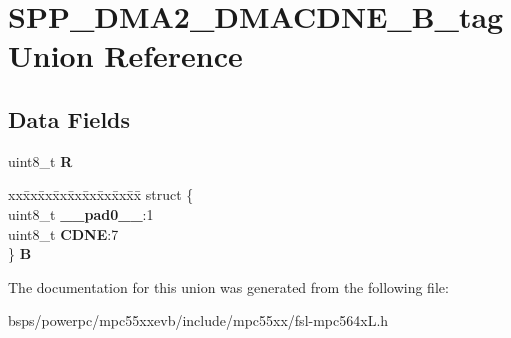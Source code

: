 \hypertarget{unionSPP__DMA2__DMACDNE__8B__tag}{}\section{S\+P\+P\+\_\+\+D\+M\+A2\+\_\+\+D\+M\+A\+C\+D\+N\+E\+\_\+B\+\_\+tag Union Reference}
\label{unionSPP__DMA2__DMACDNE__8B__tag}
\subsection*{Data Fields}
\begin{DoxyCompactItemize}
\item 
\mbox{\label{unionSPP__DMA2__DMACDNE__8B__tag_a2315aff1e5b25e0afc3a7522c8f9caf1}} 
uint8\+\_\+t {\bfseries R}
\item 
\mbox{\label{unionSPP__DMA2__DMACDNE__8B__tag_a090020c07301cb64da8548c26dd55037}} 
\begin{tabbing}
xx\=xx\=xx\=xx\=xx\=xx\=xx\=xx\=xx\=\kill
struct \{\\
\>uint8\_t {\bfseries \_\_pad0\_\_}:1\\
\>uint8\_t {\bfseries CDNE}:7\\
\} {\bfseries B}\\

\end{tabbing}\end{DoxyCompactItemize}


The documentation for this union was generated from the following file\+:\begin{DoxyCompactItemize}
\item 
bsps/powerpc/mpc55xxevb/include/mpc55xx/fsl-\/mpc564x\+L.\+h\end{DoxyCompactItemize}

